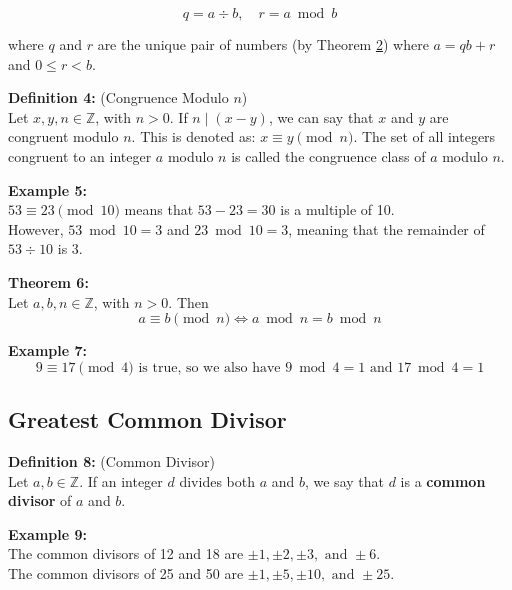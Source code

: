 \documentclass[12pt]{article}
\begin{document}
\[
q = a \div b, \quad r = a \bmod b
\]

where $q$ and $r$ are the unique pair of numbers (by Theorem \hyperref[thm:division]{2}) where $a = qb + r$ and $0 \leq r < b$.

\vspace{5mm}

\noindent\textbf{Definition 4:} (Congruence Modulo $n$)
\label{def:congruence}
\\Let $x,y,n \in \mathbb{Z}$, with $n > 0$. If $n \mid (x - y)$, we can say that $x$ and $y$ are congruent modulo $n$. 
This is denoted as: $x \equiv y \pmod{n}$.
The set of all integers congruent to an integer $a$ modulo $n$ is called the congruence class of $a$ modulo $n$.

\vspace{5mm}

\noindent\textbf{Example 5:} 
\label{ex:modexample}
\\ $53 \equiv 23 \pmod{10}$ means that $53-23=30$ is a multiple of 10. 
\\However, $53 \bmod 10 = 3$ and $23 \bmod 10 = 3$, meaning that the remainder of $53 \div 10$ is $3$.

\vspace{5mm}

\noindent\textbf{Theorem 6:} 
\label{thm:modiff}
\\Let $a,b,n \in \mathbb{Z}$, with $n > 0$. 
Then 
\[
a \equiv b \pmod{n} \iff a \bmod n = b \bmod n
\]

\vspace{5mm}

\noindent\textbf{Example 7:}
\label{ex:modexample2}
\[
9 \equiv 17 \pmod{4} \text{ is true, so we also have } 
9\bmod 4 = 1 \text{ and } 17 \bmod 4 = 1
\]

\vspace{15mm}

\subsection{Greatest Common Divisor}

\noindent\textbf{Definition 8:} (Common Divisor)
\label{def:commondivisor}
\\Let $a,b \in \mathbb{Z}$. If an integer $d$ divides both $a$ and $b$, we say that $d$ is a \textbf{common divisor} of $a$ and $b$.

\vspace{5mm}

\noindent\textbf{Example 9:}
\label{ex:commondvs}
\\The common divisors of 12 and 18 are $\pm1, \pm2, \pm3, \text{ and } \pm6$.
\\The common divisors of 25 and 50 are $\pm1, \pm5, \pm10, \text{ and } \pm25$.
\end{document}
